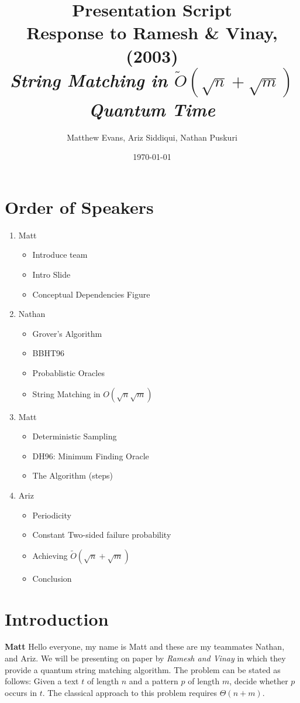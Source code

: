 \documentclass[11pt]{article}
\title{Presentation Script \\ 
\Large{Response to Ramesh \& Vinay, (2003)\\ 
\small{\textit{String Matching in \(\tilde{O}(\sqrt{n} + \sqrt{m})\) Quantum Time}} }}
\author{%
\normalsize{Matthew Evans, Ariz Siddiqui, Nathan Puskuri}
}
\date{\today}
\begin{document}
\maketitle

\section*{Order of Speakers}
\begin{enumerate}
  \item Matt
        \begin{itemize}
          \item Introduce team
          \item Intro Slide
          \item Conceptual Dependencies Figure
        \end{itemize}
  \item Nathan \begin{itemize}
          \item Grover's Algorithm
          \item BBHT96
          \item Probablistic Oracles
          \item String Matching in \(O(\sqrt{n} \sqrt{m})\)
        \end{itemize}
  \item Matt \begin{itemize}
          \item Deterministic Sampling
          \item DH96: Minimum Finding Oracle
          \item The Algorithm (steps)
        \end{itemize}
  \item Ariz \begin{itemize}
          \item Periodicity
          \item Constant Two-sided failure probability
          \item Achieving \(\tilde{O}(\sqrt{n} + \sqrt{m})\)
          \item Conclusion
        \end{itemize}
\end{enumerate}

\section*{Introduction}
\textbf{Matt} \linebreak
Hello everyone, my name is Matt and these are my teammates Nathan, and Ariz.
We will be presenting on paper by \textit{Ramesh and Vinay} in which they provide a quantum string matching algorithm. The problem can be stated as follows: Given a text $t$ of length $n$ and a pattern $p$ of length $m$, decide whether $p$ occurs in $t$. The classical approach to this problem requires $\Theta(n + m)$.
\end{document}
